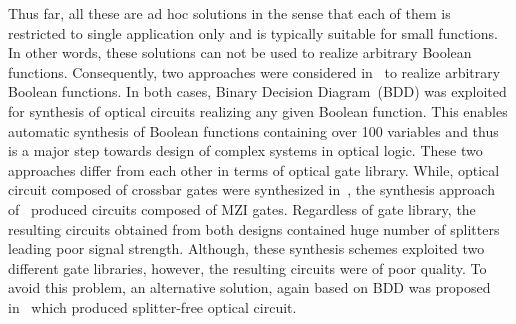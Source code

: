 \documentclass[10pt,letterpaper,twoside,openright]{book}
\begin{document}
Thus far, all these are ad hoc solutions in the sense that each of them is restricted to single application only and is typically suitable for small functions. In other words, these solutions can not be used to realize arbitrary Boolean functions. Consequently, two approaches were considered in~\cite{Condrat2011,SchonbornDWSRD15} to realize arbitrary Boolean functions. In both cases, Binary Decision Diagram~(BDD) was exploited for synthesis of optical circuits realizing any given Boolean function. This enables automatic synthesis of Boolean functions containing over 100 variables and thus is a major step towards design of complex systems in optical logic. These two approaches differ from each other in terms of optical gate library. While, optical circuit composed of crossbar gates were synthesized in~\cite{Condrat2011}, the synthesis approach of~\cite{SchonbornDWSRD15} produced circuits composed of MZI gates. Regardless of gate library, the resulting circuits obtained from both designs contained huge number of splitters leading poor signal strength. Although, these synthesis schemes exploited two different gate libraries, however, the resulting circuits were of poor quality. To avoid this problem, an alternative solution, again based on BDD was proposed in~\cite{WKHD:2015} which produced splitter-free optical circuit.   
 
\end{document}
